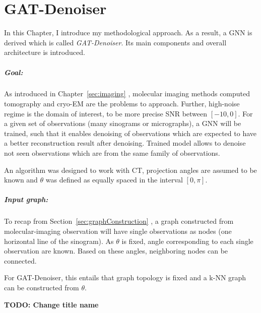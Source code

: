 \chapter{GAT-Denoiser}
\label{sec:contribution}

In this Chapter, I introduce my methodological approach.
As a result, a GNN is derived which is called \textit{GAT-Denoiser}.
Its main components and overall architecture is introduced.


\paragraph{Goal:}
As introduced in Chapter~\ref{sec:imaging} \textit{}, molecular imaging methods computed tomography and cryo-EM are the problems
to approach. Further, high-noise regime is the domain of interest, to be more precise SNR between $[-10, 0]$.
For a given set of observations (many sinograms or micrographs), a GNN will be trained, such that
it enables denoising of observations which are expected to have a better reconstruction result after denoising.
Trained model allows to denoise not seen observations which are from the same family of observations.


\begin{tcolorbox}[colback=red!5!white,colframe=red!75!black]
  An algorithm was designed to work with CT, projection angles are assumed to be known and $\theta$ was defined as equally spaced 
  in the interval $[0, \pi]$. 
\end{tcolorbox}

\paragraph{Input graph:}
To recap from Section~\ref{sec:graphConstruction}  \textit{}, 
a graph constructed from molecular-imaging observation will have single observations as nodes (one horizontal line of the sinogram). 
As $\theta$ is fixed, angle corresponding to each single observation are known. 
Based on these angles, neighboring nodes can be connected.

\begin{tcolorbox}[colback=red!5!white,colframe=red!75!black]
  For GAT-Denoiser, this entails that graph topology is fixed and
  a k-NN graph can be constructed from $\theta$.
\end{tcolorbox}


\textbf{TODO: Change title name}

